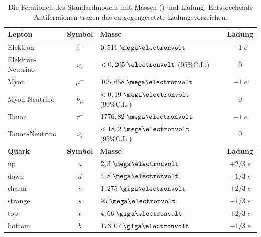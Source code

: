 \begin{table}
    \centering
    \begin{tabular}{|l|c|l|c|}
        \hline
        \bf{Lepton} & \bf{Symbol} & \bf{Masse} & \bf{Ladung} \\
        \hline\hline
        Elektron          & $e^-$      & $0,511 \MeV$             & $-1\;e$ \\
        Elektron-Neutrino & $\nu_e$    & $<0,205 \eV$ (95\%C.L.)  & $0$     \\
        \hline
        Myon              & $\mu^-$    & $105,658 \MeV$           & $-1\;e$ \\
        Myon-Neutrino     & $\nu_\mu$  & $<0,19 \MeV$  (90\%C.L.) & $0$     \\
        \hline
        Tauon             & $\tau^-$   & $1776,82 \MeV$           & $-1\;e$ \\
        Tauon-Neutrino    & $\nu_\tau$ & $<18,2 \MeV$  (95\%C.L.) & $0$     \\
        \hline\hline
        \bf{Quark} & \bf{Symbol} & \bf{Masse} & \bf{Ladung} \\
        \hline\hline
        up      & $u$ & $2,3 \MeV$    & $+2/3\;e$ \\
        down    & $d$ & $4,8 \MeV$    & $-1/3\;e$ \\
        \hline
        charm   & $c$ & $1,275 \GeV$  & $+2/3\;e$ \\
        strange & $s$ & $95  \MeV$    & $-1/3\;e$ \\
        \hline
        top     & $t$ & $4,66 \GeV$   & $+2/3\;e$ \\
        bottom  & $b$ & $173,07 \GeV$ & $-1/3\;e$ \\
        \hline
    \end{tabular}
    \caption[Die Fermionen des Standardmodells]
        {Die Fermionen des Standardmodells mit Massen
        (\cite{PhysRevD.86.010001}) und Ladung. Entsprechende Antifermionen
        tragen das entgegengesetzte Ladungsvorzeichen.}
    \label{tab:fermions}
\end{table}




